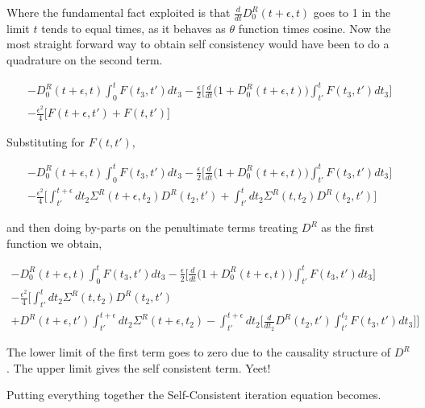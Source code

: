 \documentclass{amsart}
\begin{document}
    Where the fundamental fact exploited is that $\frac{d}{dt}D_0^R(t+\epsilon,t)$ goes to 1 in the limit $t$ tends to equal times, as it behaves as $\theta$ function times cosine. Now the most straight forward way to obtain self consistency would have been to do a quadrature on the second  term.
    
        \begin{multline}\label{byparts3}
            -D_0^R(t+\epsilon, t)\int^{t}_{0}F(t_3,t')dt_3 -\frac{\epsilon}{2} \Big[\frac{d}{dt} \Big(1+D_0^R(t+\epsilon,t)\Big)\int^{t}_{t'} F(t_3,t')dt_3 ]\\ -\frac{\epsilon^2}{4} \Big[ F(t+\epsilon,t')+F(t,t') \Big]
        \end{multline} 
    
    Substituting for $F(t,t')$, 
    
        \begin{multline}\label{byparts4}
            -D_0^R(t+\epsilon, t)\int^{t}_{0}F(t_3,t')dt_3 -\frac{\epsilon}{2} \Big[\frac{d}{dt} \Big(1+D_0^R(t+\epsilon,t)\Big)\int^{t}_{t'} F(t_3,t')dt_3 ]\\ -\frac{\epsilon^2}{4} 
            \Big[ \int^{t+\epsilon}_{t'} dt_2  \Sigma^R (t+\epsilon,t_2) D^R(t_2, t')
            +\int^{t}_{t'} dt_2  \Sigma^R (t,t_2) D^R(t_2, t') \Big]
        \end{multline}
        
    and then doing by-parts on the penultimate terms treating $D^R$ as the first function we obtain,
    
    
        \begin{multline}\label{byparts5}
            -D_0^R(t+\epsilon, t)\int^{t}_{0}F(t_3,t')dt_3 -\frac{\epsilon}{2} \Big[\frac{d}{dt} \Big(1+D_0^R(t+\epsilon,t)\Big)\int^{t}_{t'} F(t_3,t')dt_3 ]\\ -\frac{\epsilon^2}{4} 
            \Big[ \int^{t}_{t'} dt_2  \Sigma^R (t,t_2) D^R(t_2, t')
            \\+  D^R(t+\epsilon, t')\int^{t+\epsilon}_{t'} dt_2  \Sigma^R (t+\epsilon,t_2) -\int^{t+\epsilon}_{t'} dt_2 \big[\frac{d}{dt_2} D^R(t_2 ,t')\int^{t_2}_{t'} F(t_3,t')dt_3\big]
            \Big]
        \end{multline}
        
    The lower limit of the first term goes to zero due to the causality structure of $D^R$. The upper limit gives the self consistent term. Yeet!
    \par Putting everything together the Self-Consistent iteration equation becomes.   
    
\end{document}
